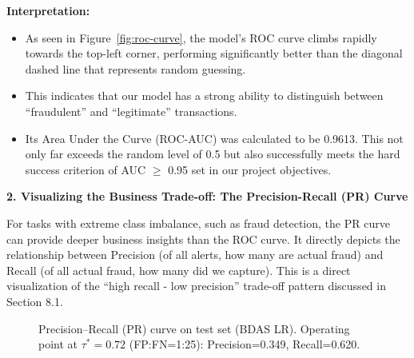 \documentclass[sigplan,screen]{acmart}
\begin{document}
\textbf{Interpretation:}

\begin{itemize}
\item As seen in Figure~\ref{fig:roc-curve}, the model's ROC curve climbs rapidly towards the top-left corner, performing significantly better than the diagonal dashed line that represents random guessing.
\item This indicates that our model has a strong ability to distinguish between ``fraudulent'' and ``legitimate'' transactions.
\item Its Area Under the Curve (ROC-AUC) was calculated to be 0.9613. This not only far exceeds the random level of 0.5 but also successfully meets the hard success criterion of AUC $\geq$ 0.95 set in our project objectives.
\end{itemize}

\textbf{2. Visualizing the Business Trade-off: The Precision-Recall (PR) Curve}

For tasks with extreme class imbalance, such as fraud detection, the PR curve can provide deeper business insights than the ROC curve. It directly depicts the relationship between Precision (of all alerts, how many are actual fraud) and Recall (of all actual fraud, how many did we capture). This is a direct visualization of the ``high recall - low precision'' trade-off pattern discussed in Section 8.1.

\begin{figure}[h]
  \centering
  \caption{Precision--Recall (PR) curve on test set (BDAS LR). Operating point at $\tau^*=0.72$ (FP:FN=1:25): Precision=0.349, Recall=0.620.}
  \label{fig:pr-curve}
\end{figure}
\end{document}

